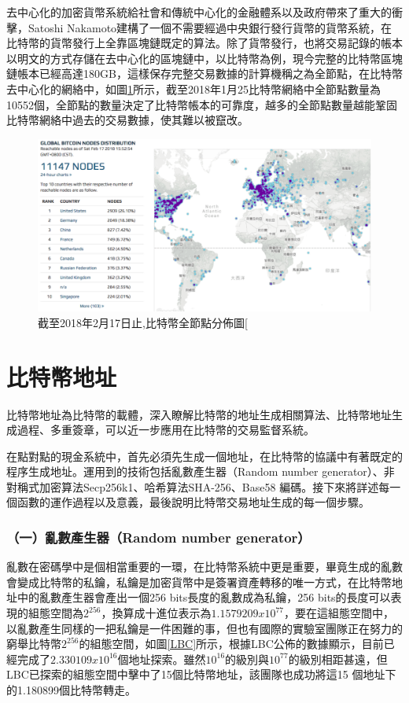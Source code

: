 		去中⼼化的加密貨幣系統給社會和傳統中⼼化的⾦融體系以及政府帶來了重⼤的衝擊，Satoshi Nakamoto建構了一個不需要經過中央銀行發行貨幣的貨幣系統，在比特幣的貨幣發行上全靠區塊鏈既定的算法。除了貨幣發行，也將交易記錄的帳本以明文的方式存儲在去中心化的區塊鏈中，以比特幣為例，現今完整的比特幣區塊鏈帳本已經高達180GB，這樣保存完整交易數據的計算機稱之為全節點，在比特幣去中心化的網絡中，如圖\ref{bitcoinfullnode}所示，截至2018年1月25比特幣網絡中全節點數量為10552個\supercite{bitcoinfullnode}，全節點的數量決定了比特幣帳本的可靠度，越多的全節點數量越能鞏固⽐特幣網絡中過去的交易數據，使其難以被竄改。

		\begin{figure}
			\centering
			\includegraphics[width = .9\textwidth]{bitcoinfullnode.png}
			\caption{截至2018年2月17日止,⽐特幣全節點分佈圖[\supercite{bitcoinfullnode}}\label{bitcoinfullnode}
		\end{figure}


		\section{比特幣地址}
		⽐特幣地址為⽐特幣的載體，深⼊瞭解⽐特幣的地址⽣成相關算法、⽐特幣地址⽣成過程、多重簽章，可以近⼀步應⽤在比特幣的交易監督系統。
		
		在點對點的現金系統中，首先必須先生成一個地址，在比特幣的協議中有著既定的程序生成地址。運用到的技術包括亂數產生器（Random number generator）、非對稱式加密算法Secp256k1\supercite{johnson2001elliptic}、哈希算法SHA-256\supercite{DBLP:conf/fse/KhovratovichRS12}、Base58 編碼\supercite{Base58}。接下來將詳述每一個函數的運作過程以及意義，最後說明比特幣交易地址生成的每一個步驟。
			
				\subsubsection{（一）亂數產生器（Random number generator）}
				亂數在密碼學中是個相當重要的一環，在比特幣系統中更是重要，畢竟生成的亂數會變成比特幣的私鑰，私鑰是加密貨幣中是簽署資產轉移的唯一方式，在比特幣地址中的亂數產生器會產出一個256 bits長度的亂數成為私鑰，256 bits的長度可以表現的組態空間為$2^{256}$，換算成十進位表示為$1.1579209x10^{77}$，要在這組態空間中，以亂數產生同樣的一把私鑰是一件困難的事，但也有國際的實驗室\supercite{TheLargeBitcoinCollider}團隊正在努力的窮舉比特幣$2^{256}$的組態空間，如圖\ref{LBC}所示，根據LBC公佈的數據顯示，目前已經完成了$2.330109x10^{16}$個地址探索。雖然$10^{16}$的級別與$10^{77}$的級別相距甚遠，但LBC已探索的組態空間中擊中了15個比特幣地址，該團隊也成功將這15 個地址下的1.180899個比特幣轉走。

